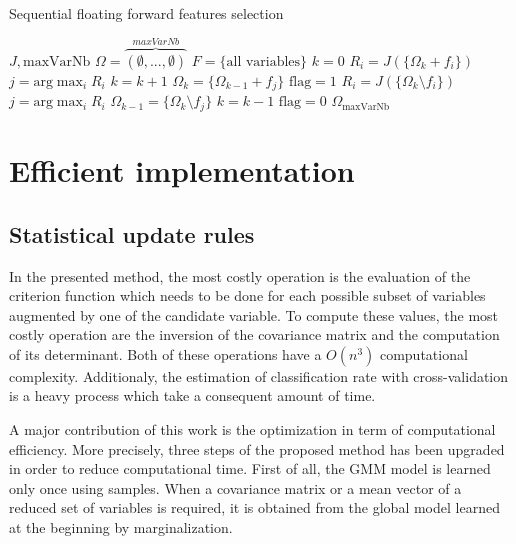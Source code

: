 \documentclass[journal,peerreview,onecolumn]{IEEEtran}
\begin{document}
            \begin{algorithm}
            \caption{Sequential floating forward features selection\label{alg:sffs}}
            {\footnotesize
            \begin{algorithmic}[1]
            \REQUIRE $J,\text{maxVarNb}$
            \STATE $\Omega=\overbrace{(\emptyset,...,\emptyset)}^{maxVarNb}$
            \STATE $F=\text{\{all variables\}}$
            \STATE $k=0$
            \STATE $R_i = J(\{\Omega_k + f_i\})$
            \ENDFOR
            \STATE $j=\text{arg} \max_{i} R_i$
            \STATE $k=k+1$
            \STATE $\Omega_k = \{\Omega_{k-1} + f_j\}$
            \STATE $\text{flag}=1$
            \STATE $R_i = J(\{\Omega_k \setminus f_i\})$
            \ENDFOR
            \STATE $j=\text{arg} \max_{i} R_i$
            \STATE $\Omega_{k-1} = \{\Omega_k \setminus f_j\}$
            \STATE $k=k-1$
            \ELSE
            \STATE $\text{flag}=0$
            \ENDIF
            \ENDWHILE
            \ENDIF
            \ENDWHILE
            \RETURN $\Omega_{\text{maxVarNb}}$
            \end{algorithmic}
            }
            \end{algorithm}


\section{Efficient implementation}
\label{sec:implementation}

    \subsection{Statistical update rules}
    In the presented method, the most costly operation is the evaluation of the criterion function which needs to be done for each possible subset of variables augmented by one of the candidate variable. To compute these values, the most costly operation are the inversion of the covariance matrix and the computation of its determinant. Both of these operations have a $O(n^3)$ computational complexity. Additionaly, the estimation of classification rate with cross-validation is a heavy process which take a consequent amount of time.

    A major contribution of this work is the optimization in term of computational efficiency. More precisely, three steps of the proposed method has been upgraded in order to reduce computational time. First of all, the GMM model is learned only once using samples. When a covariance matrix or a mean vector of a reduced set of variables is required, it is obtained from the global model learned at the beginning by marginalization.
\end{document}
